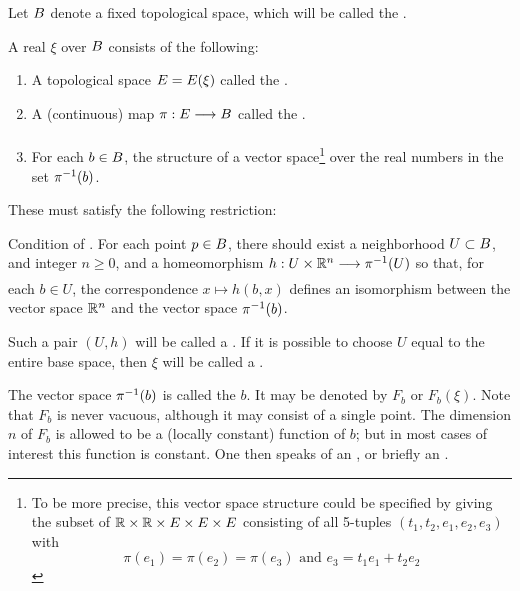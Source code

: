 \documentclass[../main]{subfiles}
\begin{document}
Let $B$ denote a fixed topological space, which will be called the .


\begin{definition}\label{def:02.01}
A real  $\xi$ over $B$ consists of the following:
\begin{enumerate}[label = \arabic*)]

    \item A topological space $E=E(\xi)$ called the .
    
    \item A (continuous) map $\pi:\total\varrightarrow{}\base$ called the .
    
    \item For each $b\in B$, the structure of a vector space\footnote{
    To be more precise, this vector space structure could be specified by giving the subset of $\mathbb R\times\mathbb R\times E \times E \times E$ consisting of all 5-tuples $(t_1,t_2,e_1,e_2,e_3)$ with
    \[\pi(e_1)=\pi(e_2)=\pi(e_3) \text { and }e_3=t_1e_1+t_2e_2\]} over the real numbers in the set $\pi^{-1}(b)$.
    
\end{enumerate}
\end{definition}


These must satisfy the following restriction:

Condition of . For each point $p\in B$, there should exist a neighborhood $U\subset B$, and integer $n\ge0$, and a homeomorphism \newline $h:U\times\bR^n\varrightarrow{}\pi\inv(U)$ so that, for each $b\in U$, the correspondence $x\mapsto h(b,x)$ defines an isomorphism between the vector space $\mathbb R^n$ and the vector space $\pi^{-1}(b)$.

Such a pair $(U,h)$ will be called a . If it is possible to choose $U$ equal to the entire base space, then $\xi$ will be called a .

The vector space $\pi^{-1}(b)$ is called the  $b$. It may be denoted by $F_b$ or $F_b(\xi)$. Note that $F_b$ is never vacuous, although it may consist of a single point. The dimension $n$ of $F_b$ is allowed to be a (locally constant) function of $b$; but in most cases of interest this function is constant. One then speaks of an , or briefly an .
\end{document}
